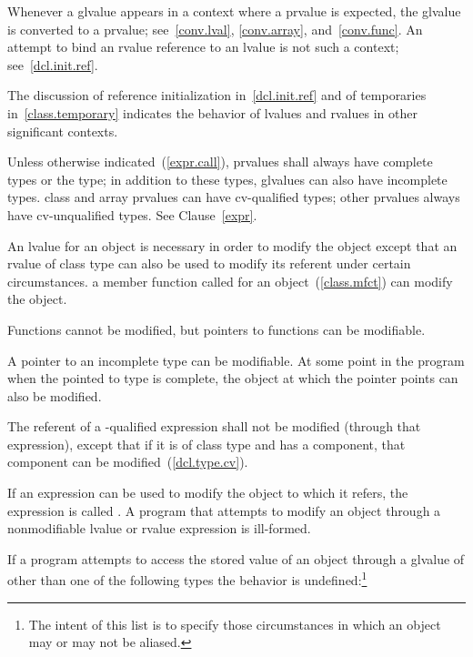 \pnum
Whenever a glvalue appears in a context where a prvalue is expected, the glvalue is converted
to a prvalue; see~\ref{conv.lval}, \ref{conv.array},
and~\ref{conv.func}.
\enternote
An attempt to bind an rvalue reference to an lvalue is not such a context; see~\ref{dcl.init.ref}.
\exitnote

\pnum
The discussion of reference initialization in~\ref{dcl.init.ref} and of
temporaries in~\ref{class.temporary} indicates the behavior of lvalues
and rvalues in other significant contexts.

\pnum
Unless otherwise indicated~(\ref{expr.call}), prvalues
shall always have complete types or the
 type; in addition to these types, glvalues can also have
incomplete types.
\enternote
class and array prvalues can have cv-qualified types; other prvalues
always have cv-unqualified types. See Clause~\ref{expr}.
\exitnote

\pnum
An lvalue for an object is necessary in order to modify the object
except that an rvalue of class type can also be used to modify its
referent under certain circumstances. \enterexample a member function
called for an object~(\ref{class.mfct}) can modify the object.
\exitexample

\pnum
Functions cannot be modified, but pointers to functions can be
modifiable.

\pnum
A pointer to an incomplete type can be modifiable. At some point in the
program when the pointed to type is complete, the object at which the
pointer points can also be modified.

\pnum
The referent of a -qualified expression shall not be
modified (through that expression), except that if it is of class type
and has a  component, that component can be
modified~(\ref{dcl.type.cv}).

\pnum
If an expression can be used to modify the object to which it refers,
the expression is called . A program that attempts
to modify an object through a nonmodifiable lvalue or rvalue expression
is ill-formed.

\pnum
If a program attempts to access the stored value of an object through a glvalue
of other than one of the following types the behavior is
undefined:\footnote{The intent of this list is to specify those circumstances in which an
object may or may not be aliased.}

